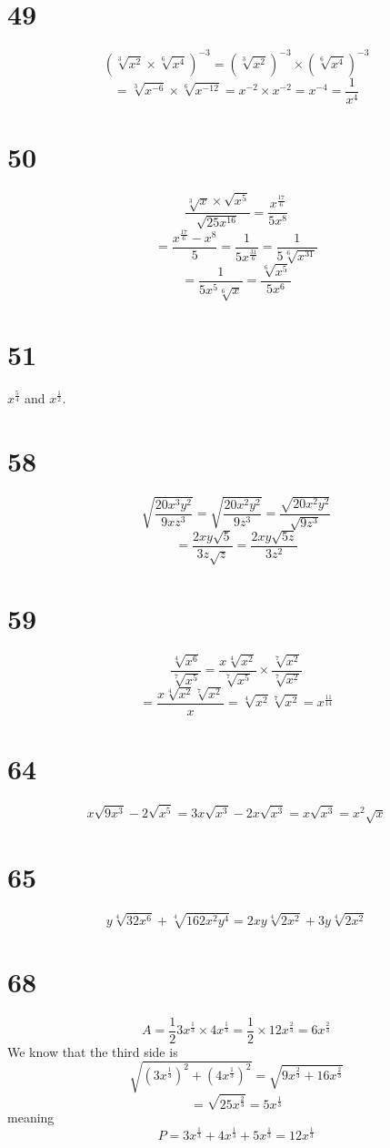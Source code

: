 \documentclass{article}
\theoremstyle{definition}
\begin{document}
\section*{49}
\[ (\sqrt[3]{x^2}\times \sqrt[6]{x^4})^{-3}=(\sqrt[3]{x^2})^{-3}\times (\sqrt[6]{x^4})^{-3} \]
\[ =\sqrt[3]{x^{-6}}\times \sqrt[6]{x^{-12}}=x^{-2}\times x^{-2}=x^{-4}=\frac{1}{x^4} \]

\section*{50}
\[ \dfrac{\sqrt[3]{x}\times\sqrt{x^5}}{\sqrt{25x^{16}}}=\frac{x^\frac{17}{6}}{5x^8} \]
\[ =\frac{x^\frac{17}{6}-x^8}{5}=\frac{1}{5x^\frac{31}{6}}=\frac{1}{5\sqrt[6]{x^{31}}} \]
\[ =\frac{1}{5x^5\sqrt[6]{x}}=\frac{\sqrt[6]{x^5}}{5x^6} \]

\section*{51}
$x^\frac{5}{4}$ and $x^\frac{1}{2}$.

\section*{58}
\[ \sqrt{\frac{20x^3y^2}{9xz^3}}=\sqrt{\frac{20x^2y^2}{9z^3}}=\frac{\sqrt{20x^2y^2}}{\sqrt{9z^3}} \]
\[ =\frac{2xy\sqrt{5}}{3z\sqrt{z}}=\frac{2xy\sqrt{5z}}{3z^2} \]

\section*{59}
\[ \frac{\sqrt[4]{x^6}}{\sqrt[7]{x^5}}=\frac{x\sqrt[4]{x^2}}{\sqrt[7]{x^5}}\times\frac{\sqrt[7]{x^2}}{\sqrt[7]{x^2}} \]
\[ =\frac{x\sqrt[4]{x^2}\sqrt[7]{x^2}}{x}=\sqrt[4]{x^2}\sqrt[7]{x^2}=x^\frac{11}{14} \]

\section*{64}
\[ x\sqrt{9x^3}-2\sqrt{x^5}=3x\sqrt{x^3}-2x\sqrt{x^3}=x\sqrt{x^3}=x^2\sqrt{x} \]

\section*{65}
\[ y\sqrt[4]{32x^6}+\sqrt[4]{162x^2y^4}=2xy\sqrt[4]{2x^2}+3y\sqrt[4]{2x^2} \]

\section*{68}
\[ A=\frac{1}{2}3x^\frac{1}{3}\times 4x^\frac{1}{3}=\frac{1}{2}\times 12x^\frac{2}{3}=6x^\frac{2}{3} \]
We know that the third side is \[ \sqrt{(3x^\frac{1}{3})^2+(4x^\frac{1}{3})^2}=\sqrt{9x^\frac{2}{3}+16x^\frac{2}{3}} \]
\[ =\sqrt{25x^\frac{2}{3}}=5x^\frac{1}{3} \] meaning \[ P=3x^\frac{1}{3}+4x^\frac{1}{3}+5x^\frac{1}{3}=12x^\frac{1}{3} \]
\end{document}
